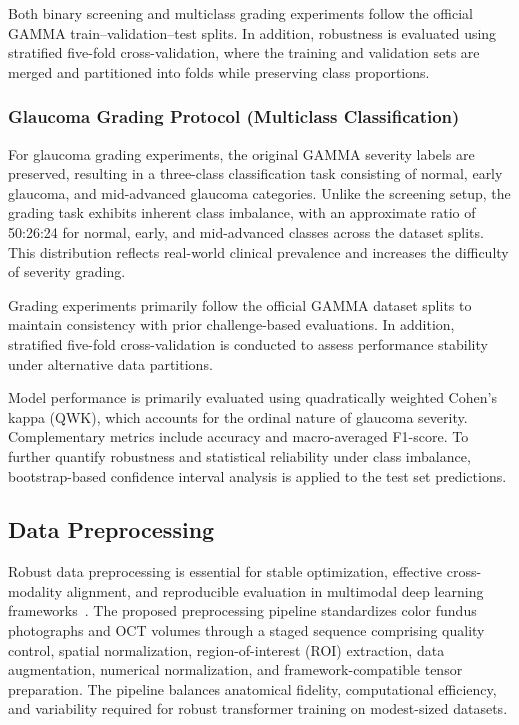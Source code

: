 \documentclass[preprint,12pt]{elsarticle}
\begin{document}
Both binary screening and multiclass grading experiments follow the official GAMMA train–validation–test splits. In addition, robustness is evaluated using stratified five-fold cross-validation, where the training and validation sets are merged and partitioned into folds while preserving class proportions.

\subsubsection{Glaucoma Grading Protocol (Multiclass Classification)}
\label{subsec323}

For glaucoma grading experiments, the original GAMMA severity labels are preserved, resulting in a three-class classification task consisting of normal, early glaucoma, and mid-advanced glaucoma categories. Unlike the screening setup, the grading task exhibits inherent class imbalance, with an approximate ratio of 50:26:24 for normal, early, and mid-advanced classes across the dataset splits. This distribution reflects real-world clinical prevalence and increases the difficulty of severity grading.

Grading experiments primarily follow the official GAMMA dataset splits to maintain consistency with prior challenge-based evaluations. In addition, stratified five-fold cross-validation is conducted to assess performance stability under alternative data partitions.

Model performance is primarily evaluated using quadratically weighted Cohen's kappa (QWK), which accounts for the ordinal nature of glaucoma severity. Complementary metrics include accuracy and macro-averaged F1-score. To further quantify robustness and statistical reliability under class imbalance, bootstrap-based confidence interval analysis is applied to the test set predictions.

\subsection{Data Preprocessing}
\label{subsec33}

Robust data preprocessing is essential for stable optimization, effective cross-modality alignment, and reproducible evaluation in multimodal deep learning frameworks~\cite{virbukaite2023impact,sun2025hybrid}. The proposed preprocessing pipeline standardizes color fundus photographs and OCT volumes through a staged sequence comprising quality control, spatial normalization, region-of-interest (ROI) extraction, data augmentation, numerical normalization, and framework-compatible tensor preparation. The pipeline balances anatomical fidelity, computational efficiency, and variability required for robust transformer training on modest-sized datasets.
\end{document}
